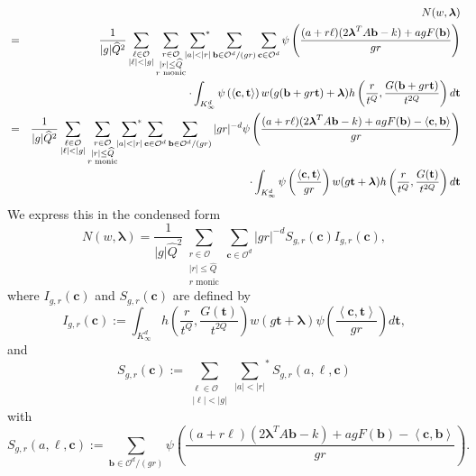 \documentclass[11pt]{amsart}
\theoremstyle{plain}
\theoremstyle{plain}
\renewcommand{\vec}[1]{\mathbf{#1}}
\theoremstyle{remark}
\theoremstyle{definition}
\renewcommand{\hat}{\widehat}
\newcommand{\Ki}{K_\infty}
\newcommand{\hQ}{\widehat{Q}}
\newcommand{\sumstar}{\sideset{}{^*}\sum}
\newcommand{\cO}{\mathcal{O}}
\begin{document}
\begin{eqnarray*}\label{form13}
&&N(w,\boldsymbol{\lambda})\\ &=&\frac{1}{|g|\hQ^2}\sum_{\substack{\ell\in \cO\\ |\ell|<|g|}}
\sum_{\substack{
r\in \cO\\
|r|\leq \hat Q\\
\text{$r$ monic}
} }
\sumstar_{\substack{
|a|<|r|} }\sum_{\vec{b}\in\mathcal{O}^d/(gr)}\sum_{\vec{c}\in\mathcal{O}^d}\psi\left(\frac{(a+r\ell)(2\boldsymbol{\lambda}^T A\vec{b}-k)+agF(\vec{b})}{gr}\right)\\&&\cdot\int_{\Ki^d}\psi\left(\left<\vec{c},\vec{t}\right>\right)w(g(\vec{b}+gr\vec{t})+\boldsymbol{\lambda})h\left(\frac{r}{t^Q},\frac{G(\vec{b}+gr\vec{t})}{t^{2Q}}\right)d\vec{t}\\ &=& \frac{1}{|g|\hQ^2}\sum_{\substack{\ell\in \cO\\ |\ell|<|g|}}
\sum_{\substack{
r\in \cO\\
|r|\leq \hat Q\\
\text{$r$ monic}
} }
\sumstar_{\substack{
|a|<|r|} }\sum_{\vec{c}\in\mathcal{O}^d}\sum_{\vec{b}\in\mathcal{O}^d/(gr)}|gr|^{-d}\psi\left(\frac{(a+r\ell)(2\boldsymbol{\lambda}^T A\vec{b}-k)+agF(\vec{b})-\left<\vec{c},\vec{b}\right>}{gr}\right)\\&&\cdot\int_{\Ki^d}\psi\left(\frac{\left<\vec{c},\vec{t}\right>}{gr}\right)w(g\vec{t}+\boldsymbol{\lambda})h\left(\frac{r}{t^Q},\frac{G(\vec{t})}{t^{2Q}}\right)d\vec{t}
\end{eqnarray*}
We express this in the condensed form
\begin{equation}\label{newequu}N(w,\boldsymbol{\lambda})=\frac{1}{|g|\hQ^2}\sum_{\substack{
r\in \cO\\
|r|\leq \hat Q\\
\text{$r$ monic}
} }\sum_{\vec{c}\in\mathcal{O}^d}|gr|^{-d}S_{g,r}(\vec{c})I_{g,r}(\vec{c}),\end{equation}
where $I_{g,r}(\vec{c})$ and $S_{g,r}(\vec{c})$ are defined by 
\begin{equation}\label{intt}
I_{g,r}(\vec{c}):= \int_{\Ki^d} h\left(\frac{r}{t^Q},\frac{G(\vec{t})}{t^{2Q}}\right) w(g\vec{t}+\boldsymbol{\lambda}) \psi\left(\frac{\left< \vec{c},\vec{t} \right>}{gr}    \right) d\vec{t},
\end{equation}
and
\begin{equation}\label{sala}S_{g,r}(\vec{c}):=\sum_{\substack{\ell\in \cO\\ |\ell|<|g|}}{\sum_{|a|<|r|}}^* S_{g,r}(a,\ell,\vec{c})\end{equation}
with
\begin{equation}\label{salam}
S_{g,r}(a,\ell,\vec{c}):=\sum_{\vec{b}\in \mathcal{O}^d/(gr)} \psi\left(\frac{(a+r\ell)(2\boldsymbol{\lambda}^T A\vec{b}-k) + ag F(\vec{b})-\left< \vec{c},\vec{b} \right>} {gr}\right).
\end{equation}
\end{document}
